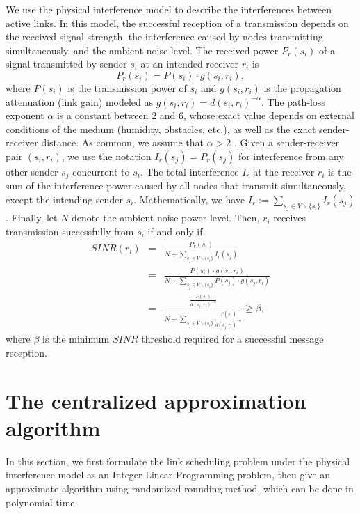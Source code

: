 \documentclass[conference]{IEEEtran}
\begin{document}
We use the physical interference model \cite{gupta2000cwn} to
describe the interferences between active links. In this model, the
successful reception of a transmission depends on the received
signal strength, the interference caused by nodes transmitting
simultaneously, and the ambient noise level. The received power
$P_{r}(s_{i})$ of a signal transmitted by sender $s_{i}$ at an
intended receiver $r_{i}$ is
\begin{displaymath} \label{power of
receiver}
    P_{r}(s_{i}) = P(s_{i})\cdot g(s_{i},r_{i}),
\end{displaymath}
where $P(s_{i})$ is the transmission power of $s_{i}$ and
$g(s_{i},r_{i})$ is the propagation attenuation (link gain) modeled
as $g(s_{i},r_{i}) = d(s_{i},r_{i})^{-\alpha}$. The path-loss
exponent $\alpha$ is a constant between 2 and 6, whose exact value
depends on external conditions of the medium (humidity, obstacles,
etc.), as well as the exact sender-receiver distance. As common, we
assume that $\alpha > 2$ \cite{gupta2000cwn}. Given a
sender-receiver pair $(s_i, r_i)$, we use the notation $I_r(s_j) =
P_r(s_j)$ for interference from any other sender $s_j$ concurrent to
$s_i$. The total interference $I_r$ at the receiver $r_i$ is the sum
of the interference power caused by all nodes that transmit
simultaneously, except the intending sender $s_i$. Mathematically,
we have $I_r := \sum_{s_j\in V\backslash\{ s_i \}} I_r(s_j)$.
Finally, let $N$ denote the ambient noise power level. Then, $r_i$
receives transmission successfully from $s_i$ if and only if
\begin{eqnarray} \label{SINR}
    SINR(r_i)&= &\frac{P_r(s_i)}{N+\sum_{s_j\in
V\backslash\{ s_i \}} I_r(s_j)} \nonumber \\
             &= &\frac{P(s_{i})\cdot g(s_{i},r_{i})}{N+\sum_{s_j\in V\backslash\{
s_i \}} P(s_{j})\cdot g(s_{j},r_{i})} \nonumber \\
             &= &\frac{\frac{P(s_i)}{d(s_{i},r_{i})^{-\alpha}}}{N+\sum_{s_j\in V\backslash\{
s_i \}} \frac{P(s_{j})}{d(s_{j},r_{i})^{-\alpha}}} \geq \beta
\nonumber,
\end{eqnarray}
where $\beta$ is the minimum $SINR$ threshold required for a
successful message reception.

\section{The centralized approximation algorithm}\label{section4}

In this section, we first formulate the link scheduling problem
under the physical interference model as an Integer Linear
Programming problem, then give an approximate algorithm using
randomized rounding method, which can be done in polynomial time.
\end{document}
